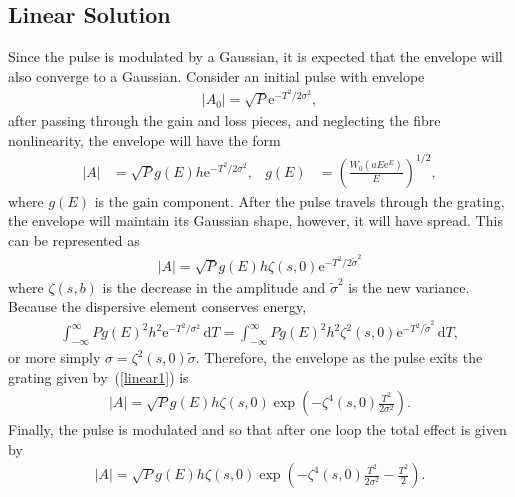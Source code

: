 \documentclass[12pt]{article}
\providecommand{\df}{\textrm{d}}
\begin{document}
\subsection{Linear Solution}
Since the pulse is modulated by a Gaussian, it is expected that the envelope will also converge to a Gaussian. Consider an initial pulse with envelope
\begin{align*}
	|A_0| = \sqrt{P} \textrm{e}^{-T^2 / 2 \sigma^2},
\end{align*}
after passing through the gain and loss pieces, and neglecting the fibre nonlinearity, the envelope will have the form
\begin{align*}
	|A| &= \sqrt{P} g(E) h \textrm{e}^{-T^2 / 2 \sigma^2},&
	g(E) &= \left( \frac{W_0(a E \textrm{e}^E)}{E} \right)^{1/2},
\end{align*}
where $g(E)$ is the gain component. After the pulse travels through the grating, the envelope will maintain its Gaussian shape, however, it will have spread. This can be represented as
\begin{align}
\label{linear1}
	|A| = \sqrt{P} g(E) h \zeta(s, 0) \textrm{e}^{-T^2 / 2 \tilde{\sigma}^2}
\end{align}
where $\zeta(s, b)$ is the decrease in the amplitude and $\widetilde{\sigma}^2$ is the new variance. Because the dispersive element conserves energy,
\begin{align*}
	\int_{-\infty}^{\infty} P g(E)^2 h^2 \textrm{e}^{-T^2 / \sigma^2} \, \df T = 
	\int_{-\infty}^{\infty} P g(E)^2 h^2 \zeta^2(s, 0) \textrm{e}^{-T^2 / \widetilde{\sigma}^2} \, \df T,
\end{align*}
or more simply $\sigma = \zeta^2(s, 0) \widetilde{\sigma}$. Therefore, the envelope as the pulse exits the grating given by~(\ref{linear1}) is
\begin{align*}
	|A| = \sqrt{P} g(E) h \zeta(s, 0) \exp \left( -\zeta^4(s, 0) \frac{T^2}{2 \sigma^2} \right).
\end{align*}
Finally, the pulse is modulated and so that after one loop the total effect is given by
\begin{align}
\label{linear2}
	|A| = \sqrt{P} g(E) h \zeta(s, 0) \exp \left( -\zeta^4(s, 0) \frac{T^2}{2 \sigma^2} - \frac{T^2}{2} \right).
\end{align}
\end{document}
